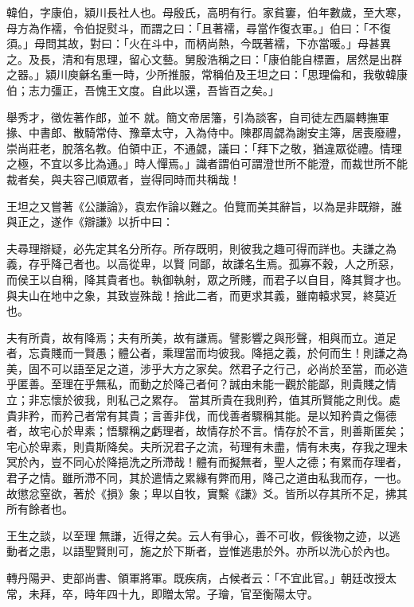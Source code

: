 \begin{pinyinscope}
 韓伯，字康伯，潁川長社人也。母殷氏，高明有行。家貧窶，伯年數歲，至大寒，母方為作襦，令伯捉熨斗，而謂之曰：「且著襦，尋當作復衣軍。」伯曰：「不復須。」母問其故，對曰：「火在斗中，而柄尚熱，今既著襦，下亦當暖。」母甚異之。及長，清和有思理，留心文藝。舅殷浩稱之曰：「康伯能自標置，居然是出群之器。」潁川庾龢名重一時，少所推服，常稱伯及王坦之曰：「思理倫和，我敬韓康伯；志力彊正，吾愧王文度。自此以還，吾皆百之矣。」



 舉秀才，徵佐著作郎，並不
 就。簡文帝居籓，引為談客，自司徒左西屬轉撫軍掾、中書郎、散騎常侍、豫章太守，入為侍中。陳郡周勰為謝安主簿，居喪廢禮，崇尚莊老，脫落名教。伯領中正，不通勰，議曰：「拜下之敬，猶違眾從禮。情理之極，不宜以多比為通。」時人憚焉。」識者謂伯可謂澄世所不能澄，而裁世所不能裁者矣，與夫容己順眾者，豈得同時而共稱哉！



 王坦之又嘗著《公謙論》，袁宏作論以難之。伯覽而美其辭旨，以為是非既辯，誰與正之，遂作《辯謙》以折中曰：



 夫尋理辯疑，必先定其名分所存。所存既明，則彼我之趣可得而詳也。夫謙之為義，存乎降己者也。以高從卑，以賢
 同鄙，故謙名生焉。孤寡不穀，人之所惡，而侯王以自稱，降其貴者也。執御執射，眾之所賤，而君子以自目，降其賢才也。與夫山在地中之象，其致豈殊哉！捨此二者，而更求其義，雖南轅求冥，終莫近也。



 夫有所貴，故有降焉；夫有所美，故有謙焉。譬影響之與形聲，相與而立。道足者，忘貴賤而一賢愚；體公者，乘理當而均彼我。降挹之義，於何而生！則謙之為美，固不可以語至足之道，涉乎大方之家矣。然君子之行己，必尚於至當，而必造乎匿善。至理在乎無私，而動之於降己者何？誠由未能一觀於能鄙，則貴賤之情立；非忘懷於彼我，則私己之累存。
 當其所貴在我則矜，值其所賢能之則伐。處貴非矜，而矜己者常有其貴；言善非伐，而伐善者驟稱其能。是以知矜貴之傷德者，故宅心於卑素；悟驟稱之虧理者，故情存於不言。情存於不言，則善斯匿矣；宅心於卑素，則貴斯降矣。夫所況君子之流，茍理有未盡，情有未夷，存我之理未冥於內，豈不同心於降挹洗之所滯哉！體有而擬無者，聖人之德；有累而存理者，君子之情。雖所滯不同，其於遣情之累緣有弊而用，降己之道由私我而存，一也。故懲忿窒欲，著於《損》象；卑以自牧，實繫《謙》爻。皆所以存其所不足，拂其所有餘者也。



 王生之談，以至理
 無謙，近得之矣。云人有爭心，善不可收，假後物之迹，以逃動者之患，以語聖賢則可，施之於下斯者，豈惟逃患於外。亦所以洗心於內也。



 轉丹陽尹、吏部尚書、領軍將軍。既疾病，占候者云：「不宜此官。」朝廷改授太常，未拜，卒，時年四十九，即贈太常。子璯，官至衡陽太守。




\end{pinyinscope}
